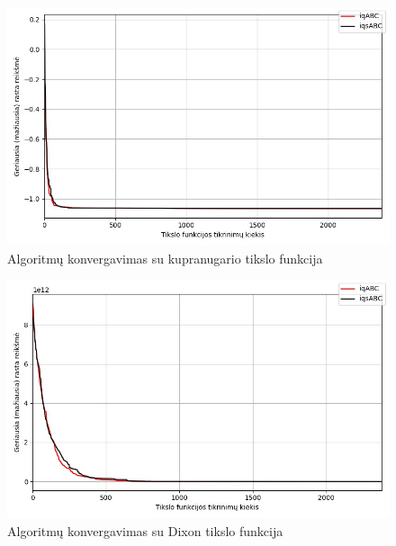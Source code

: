\documentclass{VUMIFPSmagistrinis}
\begin{document}
\begin{landscape}
\begin{multicols}{2}
\end{multicols}
\begin{multicols}{2}

\begin{figure}[H]
    \centering
    \includegraphics[scale=0.45]{img/2kg/camel.jpg}
     \caption{Algoritmų konvergavimas su kupranugario tikslo funkcija}
    \label{img:vkon3}
\end{figure}

\begin{figure}[H]
    \centering
    \includegraphics[scale=0.45]{img/2kg/dixon.jpg}
     \caption{Algoritmų konvergavimas su Dixon tikslo funkcija}
    \label{img:vkon4}
\end{figure}

\end{multicols}\newpage
\begin{multicols}{2}


\end{multicols}
\end{landscape}
\end{document}
